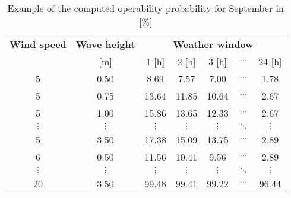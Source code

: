 \begin{table}
\label{tab:proba}
\begin{tabular}{ccccccc}
\hline
{\bf Wind speed} & {\bf Wave height} & \multicolumn{ 5}{c}{{\bf Weather window}} \\
[m/s]      &      [m]      &          1 [h] &          2 [h] &          3 [h] &  $\cdots$ &         24 [h] \\
\hline
5 &       0.50 &       8.69 &       7.57 &       7.00 &  $\cdots$ &       1.78 \\
5 &       0.75 &      13.64 &      11.85 &      10.64 &  $\cdots$ &       2.67 \\
5 &       1.00 &      15.86 &      13.65 &      12.33 &  $\cdots$ &       2.67 \\
 $\vdots$ &  $\vdots$ &  $\vdots$ &  $\vdots$ &  $\vdots$ &  $\ddots$ &  $\vdots$ \\
5 &       3.50 &      17.38 &      15.09 &      13.75 &  $\cdots$ &       2.89 \\
6 &       0.50 &      11.56 &      10.41 &       9.56 &  $\cdots$ &       2.89 \\
 $\vdots$ &  $\vdots$ &  $\vdots$ &  $\vdots$ &  $\vdots$ & $\ddots$           &  $\vdots$ \\
20 &       3.50 &      99.48 &      99.41 &      99.22 &  $\cdots$ &      96.44 \\
\hline
\end{tabular}  

\caption{Example of the computed operability probability for September in [\%]}
\end{table}